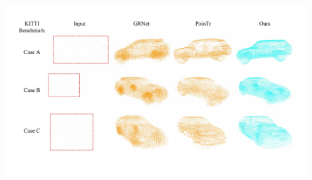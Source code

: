 \documentclass[landscape,a0paper,fontscale=0.292]{baposter}
\begin{document}
\begin{poster}
{\begin{minipage}[t]{0.49\textwidth}
\begin{center}
            \includegraphics[width=\textwidth]{images/result-KITTI.pdf}
        \end{center}
        

\end{minipage}}
\end{poster}
\end{document}
